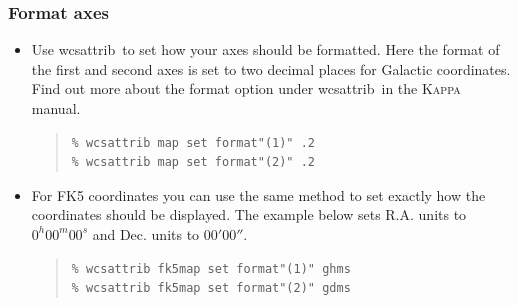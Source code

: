 \documentclass[twoside,11pt]{article}
\newenvironment{latexonly}{}{}
\newcommand{\xref}[3]{#1}
\renewcommand{\_}{\texttt{\symbol{95}}}
\newenvironment{myquote}{
   \color{MidnightBlue}\begin{quote}\begin{small}}{
   \end{small}\end{quote}
}
\newcommand{\task}[1]{\textsf{#1}}
\newcommand{\wcsattrib}{\xref{\task{wcsattrib}}{sun95}{WCSATTRIB}}
\renewenvironment{myquote}{
      \begin{quote}\begin{small}}{
      \end{small}\end{quote}
   }
\begin{document}
\subsubsection{Format axes}
\begin{itemize}
\item Use \wcsattrib\ to set how your axes should be formatted. Here the format of the first and second axes is set to two decimal places for Galactic coordinates. Find out more about the format option under \wcsattrib\ in the \xref{\textsc{Kappa} manual}{sun95}{}.
\begin{myquote}
\begin{verbatim}
% wcsattrib map set format"(1)" .2
% wcsattrib map set format"(2)" .2
\end{verbatim}
\end{myquote}

\item For FK5 coordinates you can use the same method to set exactly how the coordinates should be displayed. The example below sets R.A. units to $0^h00^m00^s$ and Dec. units to $00'00''$.
\begin{myquote}
\begin{verbatim}
% wcsattrib fk5map set format"(1)" ghms
% wcsattrib fk5map set format"(2)" gdms
\end{verbatim}
\end{myquote}
\end{itemize}
\begin{latexonly}
\newpage
\end{latexonly}
\end{document}
